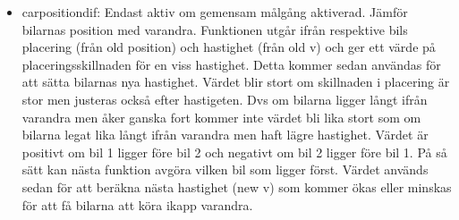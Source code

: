 \begin{itemize}
      \item car\textunderscore position\textunderscore dif: Endast aktiv om gemensam målgång aktiverad. Jämför bilarnas position med varandra. Funktionen utgår ifrån respektive bils placering (från old position) och hastighet (från old v) 
och ger ett värde på placeringsskillnaden för en viss hastighet. Detta kommer
sedan användas för att sätta bilarnas nya hastighet. Värdet blir stort om skillnaden i placering är stor men justeras också efter hastigeten. Dvs om bilarna ligger långt ifrån varandra men åker ganska fort kommer inte värdet bli lika stort som om bilarna legat lika långt ifrån varandra men haft lägre hastighet. Värdet är positivt om bil 1 ligger före bil 2 och negativt om bil 2 ligger före bil 1. På så sätt kan nästa funktion avgöra vilken bil som ligger först.
Värdet används sedan för att beräkna nästa hastighet (new v) som kommer ökas eller minskas för att få bilarna att köra ikapp varandra. 


\end{itemize}
